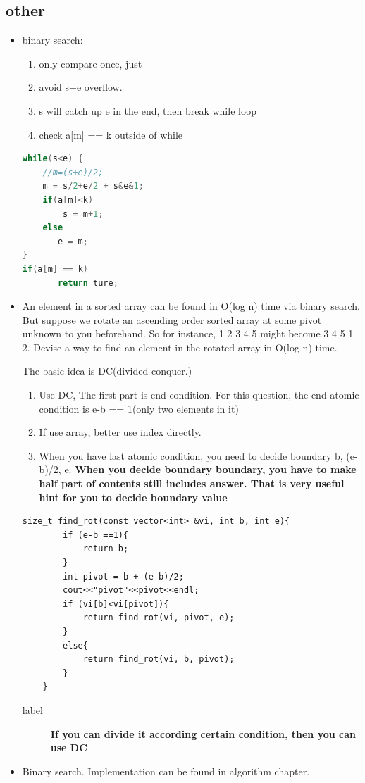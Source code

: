 \documentclass[a4paper,11pt,twoside]{book}
\begin{document}
\subsection{other }
\begin{itemize}
\item binary search:
\begin{enumerate}
\item only compare once, just  
\item avoid s+e overflow.
\item s will catch up e in the end, then break while loop 
\item check a[m] == k outside of while
\end{enumerate}

\begin{lstlisting}[frame=single, language=c++]
while(s<e) {
    //m=(s+e)/2;
    m = s/2+e/2 + s&e&1;
    if(a[m]<k)
        s = m+1;
    else 
       e = m;
}
if(a[m] == k) 
       return ture; 
\end{lstlisting}


\item An element in a sorted array can be found in O(log n) time via binary search. But suppose we rotate an ascending order sorted array at some pivot unknown to you beforehand. So for instance, 1 2 3 4 5 might become 3 4 5 1 2. Devise a way to find an element in the rotated array in O(log n) time.

The basic idea is DC(divided conquer.) 
\begin{enumerate}
	\item Use DC, The first part is end condition. For this question, the end atomic condition is e-b == 1(only two elements in it)
	\item If use array, better use index directly.
	\item When you have last atomic condition, you need to decide boundary  b, (e-b)/2, e. \textbf{When you decide boundary boundary, you have to make half part of contents still includes answer. That is very useful hint for you to decide boundary value}
\end{enumerate}

\begin{lstlisting}[breaklines]
	size_t find_rot(const vector<int> &vi, int b, int e){
		if (e-b ==1){
			return b;		
		}
		int pivot = b + (e-b)/2;
		cout<<"pivot"<<pivot<<endl;
		if (vi[b]<vi[pivot]){ 
			return find_rot(vi, pivot, e);
		}
		else{
			return find_rot(vi, b, pivot);
		}
	}
\end{lstlisting}
\begin{description}
	\item[label] \textbf{If you can divide it according certain condition, then you can use DC}
\end{description}

\item Binary search. Implementation can be found in algorithm chapter. 

\end{itemize} 
\end{document}
